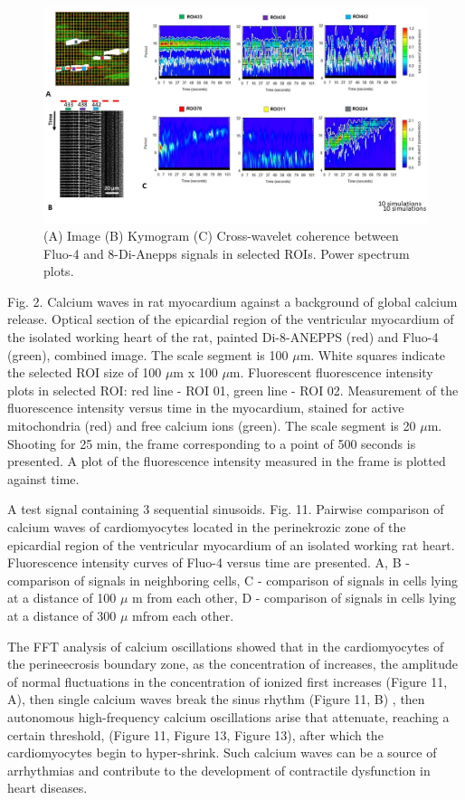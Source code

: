 \documentclass{biophys-new}
\begin{document}
 \begin{figure}
     \includegraphics[width=0.9\linewidth]{fig8.jpg}
     \caption{(A) Image (B) Kymogram (C) Cross-wavelet coherence between Fluo-4 and 8-Di-Anepps signals in selected ROIs. Power spectrum plots. }
     \label{fig:fig8}
 \end{figure}


Fig. 2.  Calcium waves in rat myocardium against a background of global calcium release.
Optical section of the epicardial region of the ventricular myocardium of the isolated working heart of the rat, painted Di-8-ANEPPS (red) and Fluo-4 (green), combined image.
The scale segment is 100 $\mu$m.
White squares indicate the selected ROI size of 100 $\mu$m x 100 $\mu$m.
Fluorescent fluorescence intensity plots in selected ROI: red line - ROI 01, green line - ROI 02.
Measurement of the fluorescence intensity versus time in the myocardium, stained for active mitochondria (red) and free calcium ions (green).
The scale segment is 20 $\mu$m. Shooting for 25 min, the frame corresponding to a point of 500 seconds is presented.
A plot of the fluorescence intensity measured in the frame is plotted against time.


A test signal containing 3 sequential sinusoids.
Fig. 11. Pairwise comparison of calcium waves of cardiomyocytes located in the perinekrozic zone of the epicardial region of the ventricular myocardium of an isolated working rat heart. Fluorescence intensity curves of Fluo-4 versus time are presented. A, B - comparison of signals in neighboring cells, C - comparison of signals in cells lying at a distance of 100 $\mu$ m from each other, D - comparison of signals in cells lying at a distance of 300 $\mu$  mfrom each other.


The FFT analysis of calcium oscillations showed that in the cardiomyocytes of the perineecrosis boundary zone, as the concentration of  increases, the amplitude of normal fluctuations in the concentration of ionized  first increases (Figure 11, A), then single calcium waves break the sinus rhythm (Figure 11, B) , then autonomous high-frequency calcium oscillations arise that attenuate, reaching a certain threshold, (Figure 11, Figure 13, Figure 13), after which the cardiomyocytes begin to hyper-shrink. Such calcium waves can be a source of arrhythmias and contribute to the development of contractile dysfunction in heart diseases.
\end{document}
